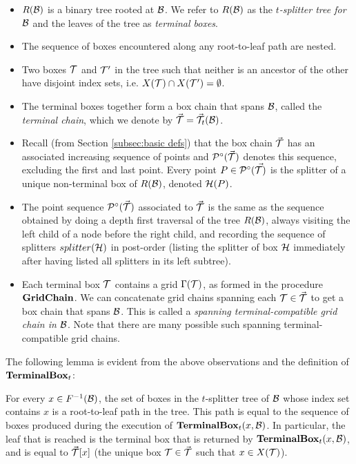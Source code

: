 \documentclass{acmsmall}
\newcommand{\cB}{{\cal B}}
\newcommand{\cH}{{\cal H}}
\newcommand{\cP}{{\cal P}}
\newcommand{\cT}{{\cal T}}
\newcommand{\terminalbox}{{\rm{\bf TerminalBox}}}
\newcommand{\width}{{\bf {\rm  w}}}
\newcommand{\gridchain}{{\rm {\bf GridChain}}}
\begin{document}
\begin{itemize}
\item $R(\cB)$ is a binary tree rooted at $\cB$.  
We refer to $R(\cB)$ as the {\em $t$-splitter tree for $\cB$} and the leaves of the tree as {\em terminal boxes}.
\item The sequence of boxes encountered along any root-to-leaf path are nested.
\item Two boxes $\cT$ and $\cT'$  in the tree such that neither is an ancestor of the other have disjoint index sets, i.e. $X(\cT) \cap X(\cT') = \emptyset$.  
\item The terminal boxes together form a box chain that spans $\cB$, called the {\em terminal chain}, which we denote by $\vec{\cT}=\vec{\cT}_t(\cB)$.
\item
Recall (from Section \ref{subsec:basic defs}) that the box chain $\vec{\cT}$ has an associated increasing sequence of points
and $\cP^{\circ}(\vec{\cT})$ denotes this sequence, excluding the first and last point.
Every point $P \in \cP^{\circ}(\vec{\cT)}$ is the splitter of a unique non-terminal box of $R(\cB)$, denoted $\cH(P)$.
\item The
point sequence $\cP^{\circ}(\vec{\cT})$
associated to $\vec{\cT}$ is the same as the sequence obtained by doing 
a depth first traversal of the tree $R(\cB)$, always visiting the left child of a node before the right child,
and recording
the sequence of splitters $splitter(\cH)$ in post-order (listing the splitter of box $\cH$ immediately after having listed all splitters in its left subtree).
\item Each terminal box $\cT$ contains a grid $\Gamma(\cT)$, as formed in the procedure $\gridchain$. We can concatenate
grid chains spanning each $\cT \in \vec{\cT}$ to get a box chain that spans $\cB$. This is called
a \emph{spanning terminal-compatible grid chain in $\cB$}. Note that there are many possible such spanning terminal-compatible grid chains.
\end{itemize}

The following lemma is evident from the above observations and the definition of $\terminalbox_t$:


\begin{lemma}
\label{lem:terminal}
For every $x \in F^{-1}(\cB)$, the set of boxes in the $t$-splitter tree of $\cB$ whose index set contains $x$
is a root-to-leaf path in the tree.   This path is equal to the sequence of boxes produced during the execution
of $\terminalbox_t(x,\cB)$.  In particular, the leaf that is reached is the terminal box that is returned
by $\terminalbox_t(x,\cB)$, and is equal to
$\vec{\cT}[x]$ (the unique box $\cT \in \vec{\cT}$ such that $x \in X(\cT)$).
\end{lemma}
\end{document}

